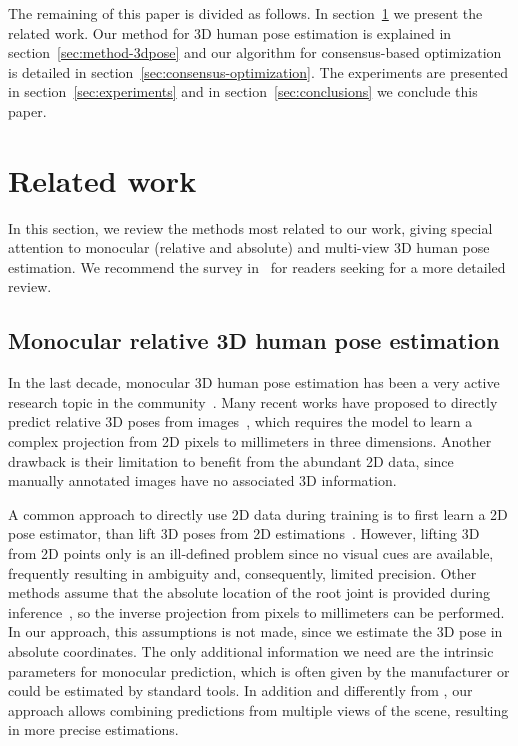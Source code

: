 \documentclass[10pt,twocolumn,letterpaper]{article}
\newcommand{\rev}[1]{#1}
\newcommand{\revb}[1]{{#1}}
\begin{document}
The remaining of this paper is divided as follows. In
section~\ref{sec:relatedwork} we present the related work. Our method for 3D
human pose estimation is explained in section~\ref{sec:method-3dpose} and
our algorithm for consensus-based optimization is detailed in
section~\ref{sec:consensus-optimization}.  The experiments are presented in
section~\ref{sec:experiments} and in section~\ref{sec:conclusions} we conclude
this paper.







\section{Related work}
\label{sec:relatedwork}

In this section, we review the methods most related to our work, giving special
attention to monocular \rev{(relative and absolute)} and multi-view 3D human
pose estimation.  We recommend the survey in~\cite{SARAFIANOS20161} for readers
seeking for a more detailed review.

\subsection{Monocular relative 3D human pose estimation}

In the last decade, monocular 3D human pose estimation has been a very active
research topic in the community~\cite{Agarwal, zhou2016deep, TekinKSLF16, Li_2015_ICCV, Ionesc_ICCV_2011}.
Many recent works have proposed to directly predict relative 3D poses from
images~\cite{Sun_2018_ECCV, Sun_2017_ICCV, Pavlakos_2017_CVPR},
which requires the model to learn a complex
projection from 2D pixels to millimeters in three dimensions. 
Another drawback is their limitation to benefit from the abundant 2D data,
since manually annotated images have no associated 3D information.

\rev{A common approach to directly use 2D data during training is to first learn a 2D
pose estimator, than} lift 3D poses from 2D estimations~\cite{Lee_2018_ECCV, Hossain_2018_ECCV,
Yang_2018_CVPR, Tome_2017_CVPR, Martinez_2017, Chen_2017_CVPR}.  However,
lifting 3D from 2D points only is an ill-defined problem \rev{since no visual
cues are available}, frequently resulting in ambiguity and, consequently,
limited precision.
Other methods assume that the absolute location of the root joint is provided
during inference~\cite{Zhou_2017_ICCV, Luvizon_2018_CVPR}, \rev{so the inverse
projection from pixels to millimeters can be performed}.
In our approach, this assumptions is not made, since we estimate
the 3D pose in absolute coordinates. The only additional information we need
are the intrinsic parameters for monocular prediction, which is
often given by the manufacturer or could be \revb{estimated by} standard tools.
\revb{In addition and differently from \cite{Luvizon_2018_CVPR}, our approach allows combining predictions from multiple views of the scene, resulting in more precise estimations}.
\end{document}
